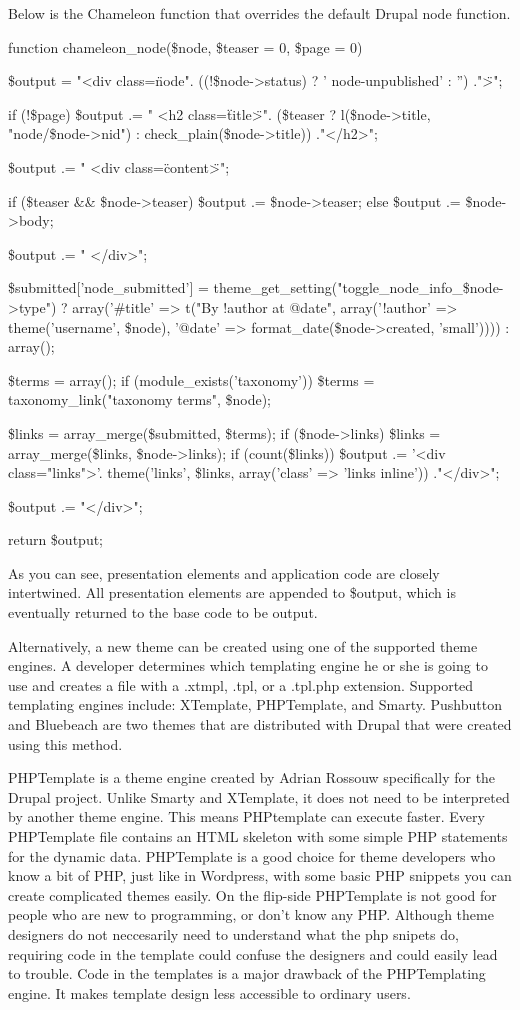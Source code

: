 \documentclass[a4paper,12pt]{report}
\begin{document}
Below is the Chameleon function that overrides the default Drupal node function.

function chameleon_node(\$node, \$teaser = 0, \$page = 0) {

  \$output  = "<div class=\"node". ((!\$node->status) ? ' node-unpublished' : '') ."\">\n";

  if (!\$page) {
    \$output .= " <h2 class=\"title\">". (\$teaser ? l(\$node->title, "node/\$node->nid") : check_plain(\$node->title)) ."</h2>\n";
  }

  \$output .= " <div class=\"content\">\n";

  if (\$teaser && \$node->teaser) {
    \$output .= \$node->teaser;
  }
  else {
    \$output .= \$node->body;
  }

  \$output .= " </div>\n";

  \$submitted['node_submitted'] = theme_get_setting("toggle_node_info_\$node->type") ? array('#title' => t("By !author at @date", array('!author' => theme('username', \$node), '@date' => format_date(\$node->created, 'small')))) : array();

  \$terms = array();
  if (module_exists('taxonomy')) {
    \$terms = taxonomy_link("taxonomy terms", \$node);
  }

  \$links = array_merge(\$submitted, \$terms);
  if (\$node->links) {
    \$links = array_merge(\$links, \$node->links);
  }
  if (count(\$links)) {
    \$output .= '<div class="links">'. theme('links', \$links, array('class' => 'links inline')) ."</div>\n";
  }

  \$output .= "</div>\n";

  return \$output;
} 

As you can see, presentation elements and application code are closely intertwined. 
All presentation elements are appended to \$output, which is eventually returned to the base code to be output.


Alternatively, a new theme can be created using one of the supported theme engines. 
A developer determines which templating engine he or she is going to use and creates a file with a .xtmpl, .tpl, or a .tpl.php extension. 
Supported templating engines include: XTemplate, PHPTemplate, and Smarty. 
Pushbutton and Bluebeach are two themes that are distributed with Drupal that were created using this method. 

PHPTemplate is a theme engine created by Adrian Rossouw specifically for the Drupal project. 
Unlike Smarty and XTemplate, it does not need to be interpreted by another theme engine. 
This means PHPtemplate can execute faster. 
Every PHPTemplate file contains an HTML skeleton with some simple PHP statements for the dynamic data. 
PHPTemplate is a good choice for theme developers who know a bit of PHP, just like in Wordpress, with some basic PHP snippets you can create complicated themes easily. 
On the flip-side PHPTemplate is not good for people who are new to programming, or don't know any PHP. 
Although theme designers do not neccesarily need to understand what the php snipets do, requiring code in the template could confuse the designers and could easily lead to trouble. 
Code in the templates is a major drawback of the PHPTemplating engine. 
It makes template design less accessible to ordinary users. 
\end{document}
